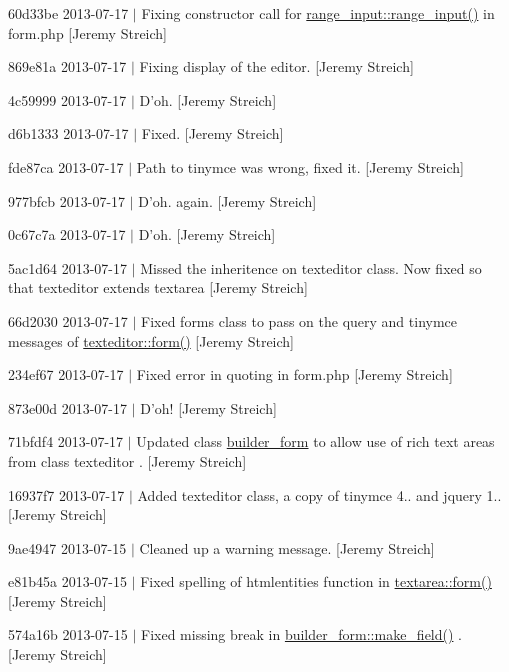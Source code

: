\begin{DoxyItemize}
\item 60d33be 2013-\/07-\/17 $|$ Fixing constructor call for \hyperlink{classrange__input_a6038a3b2b1499abb08ff6a10ac7a8e81}{range\-\_\-input\-::range\-\_\-input()} in form.\-php \mbox{[}Jeremy Streich\mbox{]}
\item 869e81a 2013-\/07-\/17 $|$ Fixing display of the editor. \mbox{[}Jeremy Streich\mbox{]}
\item 4c59999 2013-\/07-\/17 $|$ D'oh. \mbox{[}Jeremy Streich\mbox{]}
\item d6b1333 2013-\/07-\/17 $|$ Fixed. \mbox{[}Jeremy Streich\mbox{]}
\item fde87ca 2013-\/07-\/17 $|$ Path to tinymce was wrong, fixed it. \mbox{[}Jeremy Streich\mbox{]}
\item 977bfcb 2013-\/07-\/17 $|$ D'oh. again. \mbox{[}Jeremy Streich\mbox{]}
\item 0c67c7a 2013-\/07-\/17 $|$ D'oh. \mbox{[}Jeremy Streich\mbox{]}
\item 5ac1d64 2013-\/07-\/17 $|$ Missed the inheritence on texteditor class. Now fixed so that texteditor extends textarea \mbox{[}Jeremy Streich\mbox{]}
\item 66d2030 2013-\/07-\/17 $|$ Fixed forms class to pass on the query and tinymce messages of \hyperlink{classtexteditor_a129b929db008ec11f4a683f542787c74}{texteditor\-::form()} \mbox{[}Jeremy Streich\mbox{]}
\item 234ef67 2013-\/07-\/17 $|$ Fixed error in quoting in form.\-php \mbox{[}Jeremy Streich\mbox{]}
\item 873e00d 2013-\/07-\/17 $|$ D'oh! \mbox{[}Jeremy Streich\mbox{]}
\item 71bfdf4 2013-\/07-\/17 $|$ Updated class \hyperlink{classbuilder__form}{builder\-\_\-form} to allow use of rich text areas from class texteditor . \mbox{[}Jeremy Streich\mbox{]}
\item 16937f7 2013-\/07-\/17 $|$ Added texteditor class, a copy of tinymce 4.. and jquery 1.. \mbox{[}Jeremy Streich\mbox{]}
\item 9ae4947 2013-\/07-\/15 $|$ Cleaned up a warning message. \mbox{[}Jeremy Streich\mbox{]}
\item e81b45a 2013-\/07-\/15 $|$ Fixed spelling of htmlentities function in \hyperlink{classtextarea_a3e3d02a7c0ff76c86f6b987e1193ca6a}{textarea\-::form()} \mbox{[}Jeremy Streich\mbox{]}
\item 574a16b 2013-\/07-\/15 $|$ Fixed missing break in \hyperlink{classbuilder__form_a6408926fe73438032738d8a0095acf8d}{builder\-\_\-form\-::make\-\_\-field()} . \mbox{[}Jeremy Streich\mbox{]}

\end{DoxyItemize}
